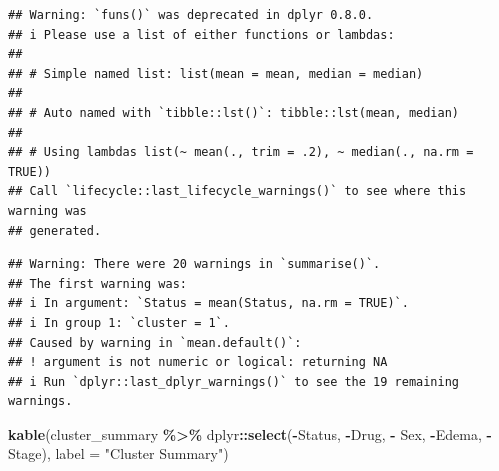 \documentclass[
]{article}
\newenvironment{Shaded}{\begin{snugshade}}{\end{snugshade}}
\newcommand{\AttributeTok}[1]{\textcolor[rgb]{0.13,0.29,0.53}{#1}}
\newcommand{\CommentTok}[1]{\textcolor[rgb]{0.56,0.35,0.01}{\textit{#1}}}
\newcommand{\ConstantTok}[1]{\textcolor[rgb]{0.56,0.35,0.01}{#1}}
\newcommand{\FunctionTok}[1]{\textcolor[rgb]{0.13,0.29,0.53}{\textbf{#1}}}
\newcommand{\NormalTok}[1]{#1}
\newcommand{\OtherTok}[1]{\textcolor[rgb]{0.56,0.35,0.01}{#1}}
\newcommand{\SpecialCharTok}[1]{\textcolor[rgb]{0.81,0.36,0.00}{\textbf{#1}}}
\newcommand{\StringTok}[1]{\textcolor[rgb]{0.31,0.60,0.02}{#1}}
\begin{document}
\begin{Shaded}
\end{Shaded}

\begin{verbatim}
## Warning: `funs()` was deprecated in dplyr 0.8.0.
## i Please use a list of either functions or lambdas:
## 
## # Simple named list: list(mean = mean, median = median)
## 
## # Auto named with `tibble::lst()`: tibble::lst(mean, median)
## 
## # Using lambdas list(~ mean(., trim = .2), ~ median(., na.rm = TRUE))
## Call `lifecycle::last_lifecycle_warnings()` to see where this warning was
## generated.
\end{verbatim}

\begin{verbatim}
## Warning: There were 20 warnings in `summarise()`.
## The first warning was:
## i In argument: `Status = mean(Status, na.rm = TRUE)`.
## i In group 1: `cluster = 1`.
## Caused by warning in `mean.default()`:
## ! argument is not numeric or logical: returning NA
## i Run `dplyr::last_dplyr_warnings()` to see the 19 remaining warnings.
\end{verbatim}

\begin{Shaded}
\begin{Highlighting}[]
\FunctionTok{kable}\NormalTok{(cluster\_summary }\SpecialCharTok{\%\textgreater{}\%}\NormalTok{ dplyr}\SpecialCharTok{::}\FunctionTok{select}\NormalTok{(}\SpecialCharTok{{-}}\NormalTok{Status, }\SpecialCharTok{{-}}\NormalTok{Drug, }\SpecialCharTok{{-}}\NormalTok{ Sex, }\SpecialCharTok{{-}}\NormalTok{Edema, }\SpecialCharTok{{-}}\NormalTok{Stage), }\AttributeTok{label =} \StringTok{"Cluster Summary"}\NormalTok{)}
\end{Highlighting}
\end{Shaded}
\end{document}
